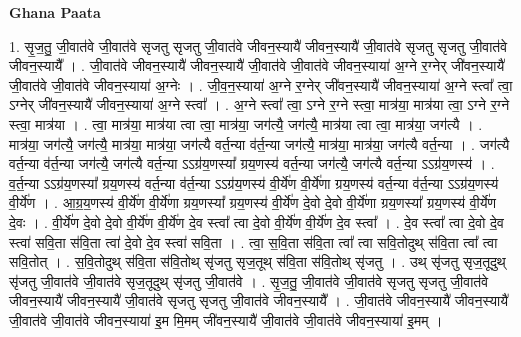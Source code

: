 \documentclass[17pt]{extarticle}
\begin{document}
\textbf{Ghana Paata } \newline

1. सृ॒ज॒तु॒ जी॒वात॑वे जी॒वात॑वे सृजतु सृजतु जी॒वात॑वे जीवन॒स्यायै॑ जीवन॒स्यायै॑ जी॒वात॑वे सृजतु सृजतु जी॒वात॑वे जीवन॒स्यायै᳚ । . जी॒वात॑वे जीवन॒स्यायै॑ जीवन॒स्यायै॑ जी॒वात॑वे जी॒वात॑वे जीवन॒स्याया॑ अ॒ग्ने र॒ग्नेर् जी॑वन॒स्यायै॑ जी॒वात॑वे जी॒वात॑वे जीवन॒स्याया॑ अ॒ग्नेः । . जी॒व॒न॒स्याया॑ अ॒ग्ने र॒ग्नेर् जी॑वन॒स्यायै॑ जीवन॒स्याया॑ अ॒ग्ने स्त्वा᳚ त्वा॒ ऽग्नेर् जी॑वन॒स्यायै॑ जीवन॒स्याया॑ अ॒ग्ने स्त्वा᳚ । . अ॒ग्ने स्त्वा᳚ त्वा॒ ऽग्ने र॒ग्ने स्त्वा॒ मात्र॑या॒ मात्र॑या त्वा॒ ऽग्ने र॒ग्ने स्त्वा॒ मात्र॑या । . त्वा॒ मात्र॑या॒ मात्र॑या त्वा त्वा॒ मात्र॑या॒ जग॑त्यै॒ जग॑त्यै॒ मात्र॑या त्वा त्वा॒ मात्र॑या॒ जग॑त्यै । . मात्र॑या॒ जग॑त्यै॒ जग॑त्यै॒ मात्र॑या॒ मात्र॑या॒ जग॑त्यै वर्त॒न्या व॑र्त॒न्या जग॑त्यै॒ मात्र॑या॒ मात्र॑या॒ जग॑त्यै वर्त॒न्या । . जग॑त्यै वर्त॒न्या व॑र्त॒न्या जग॑त्यै॒ जग॑त्यै वर्त॒न्या ऽऽग्र॑य॒णस्या᳚ ग्रय॒णस्य॑ वर्त॒न्या जग॑त्यै॒ जग॑त्यै वर्त॒न्या ऽऽग्र॑य॒णस्य॑ । . व॒र्त॒न्या ऽऽग्र॑य॒णस्या᳚ ग्रय॒णस्य॑ वर्त॒न्या व॑र्त॒न्या ऽऽग्र॑य॒णस्य॑ वी॒र्ये॑ण वी॒र्ये॑णा ग्रय॒णस्य॑ वर्त॒न्या व॑र्त॒न्या ऽऽग्र॑य॒णस्य॑ वी॒र्ये॑ण । . आ॒ग्र॒य॒णस्य॑ वी॒र्ये॑ण वी॒र्ये॑णा ग्रय॒णस्या᳚ ग्रय॒णस्य॑ वी॒र्ये॑ण दे॒वो दे॒वो वी॒र्ये॑णा ग्रय॒णस्या᳚ ग्रय॒णस्य॑ वी॒र्ये॑ण दे॒वः । . वी॒र्ये॑ण दे॒वो दे॒वो वी॒र्ये॑ण वी॒र्ये॑ण दे॒व स्त्वा᳚ त्वा दे॒वो वी॒र्ये॑ण वी॒र्ये॑ण दे॒व स्त्वा᳚ । . दे॒व स्त्वा᳚ त्वा दे॒वो दे॒व स्त्वा॑ सवि॒ता स॑वि॒ता त्वा॑ दे॒वो दे॒व स्त्वा॑ सवि॒ता । . त्वा॒ स॒वि॒ता स॑वि॒ता त्वा᳚ त्वा सवि॒तोदुथ् स॑वि॒ता त्वा᳚ त्वा सवि॒तोत् । . स॒वि॒तोदुथ् स॑वि॒ता स॑वि॒तोथ् सृ॑जतु सृज॒तूथ् स॑वि॒ता स॑वि॒तोथ् सृ॑जतु । . उथ् सृ॑जतु सृज॒तूदुथ् सृ॑जतु जी॒वात॑वे जी॒वात॑वे सृज॒तूदुथ् सृ॑जतु जी॒वात॑वे । . सृ॒ज॒तु॒ जी॒वात॑वे जी॒वात॑वे सृजतु सृजतु जी॒वात॑वे जीवन॒स्यायै॑ जीवन॒स्यायै॑ जी॒वात॑वे सृजतु सृजतु जी॒वात॑वे जीवन॒स्यायै᳚ । . जी॒वात॑वे जीवन॒स्यायै॑ जीवन॒स्यायै॑ जी॒वात॑वे जी॒वात॑वे जीवन॒स्याया॑ इ॒म मि॒मम् जी॑वन॒स्यायै॑ जी॒वात॑वे जी॒वात॑वे जीवन॒स्याया॑ इ॒मम् । \newline
\end{document}
